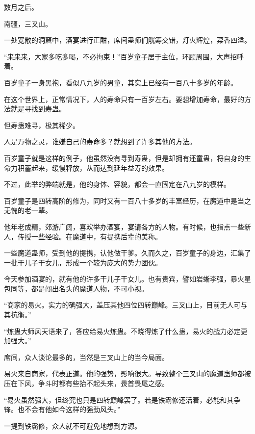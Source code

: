 
\begin{this_body}

数月之后。

南疆，三叉山。

一处宽敞的洞窟中，酒宴进行正酣，席间蛊师们觥筹交错，灯火辉煌，菜香四溢。

“来来来，大家多吃多喝，不必拘束！”百岁童子居于主位，环顾周围，大声招呼着。

百岁童子一身黑袍，看似八九岁的男童，其实上已经有一百八十多岁的年龄。

在这个世界上，正常情况下，人的寿命只有一百岁左右。要想增加寿命，最好的方法就是寻找到寿蛊。

但寿蛊难寻，极其稀少。

人是万物之灵，谁嫌自己的寿命多？就想到了许多其他的方法。

百岁童子就是这样的例子，他虽然没有寻到寿蛊，但是却拥有还童蛊，将自身的生命力积蓄起来，缓慢释放，从而达到延年益寿的效果。

不过，此举的弊端就是，他的身体、容貌，都会一直固定在八九岁的模样。

百岁童子是四转高阶的修为，同时又有一百八十多岁的丰富经历，在魔道中是当之无愧的老一辈。

他年老成精，郊游广阔，喜欢举办酒宴，宴请各方的人物。有时候，也指点一些新人，传授一些经验。在魔道中，有提携后辈的美称。

一些魔道蛊师，受到他的提携，认他做干爹。久而久之，百岁童子的身边，汇集了一批干儿子干女儿，形成一个较为庞大的势力团伙。

今天参加酒宴的，就有他的许多干儿子干女儿。也有贵宾，譬如岩蜥李强，暴火星包同等，都是闯出名头的魔道人物，不可小视。

“商家的易火。实力的确强大，盖压其他四位四转巅峰。三叉山上，目前无人可与其抗衡。”

“炼蛊大师风天语来了，答应给易火炼蛊。不晓得炼了什么蛊，易火的战力必定更加强大。”

席间，众人谈论最多的，当然是三叉山上的当今局面。

易火来自商家，代表正道。他的强势，影响很大。导致整个三叉山的魔道蛊师都被压在下风，争斗时都有些抬不起头来，畏首畏尾之感。

“易火虽然强大，但终究也只是四转巅峰罢了。若是铁霸修还活着，必能和其争锋。也不会有他如今这样的强劲风头。”

一提到铁霸修，众人就不可避免地想到方源。


\end{this_body}
